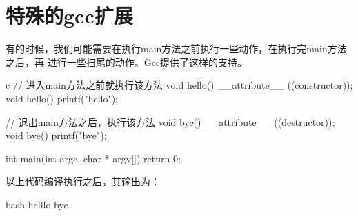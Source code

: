 \section{特殊的gcc扩展}
有的时候，我们可能需要在执行main方法之前执行一些动作，在执行完main方法之后，再
进行一些扫尾的动作。Gcc提供了这样的支持。
\begin{code-block}{c}
// 进入main方法之前就执行该方法
void hello() __attribute__ ((constructor));
void hello()
{
    printf("hello\n");
}

// 退出main方法之后，执行该方法
void bye() __attribute__ ((destructor));
void bye()
{
    printf("bye\n");
}

int main(int argc, char * argv[])
{
    return 0;
}
\end{code-block}

以上代码编译执行之后，其输出为：
\begin{code-block}{bash}
helllo
bye
\end{code-block}
